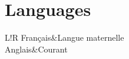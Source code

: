 \documentclass[6pt]{article}
\newcommand\VRule{\color{lightgray}\vrule width 0.5pt}
\begin{document}
\section*{Languages}
\begin{tabular}{L!{\VRule}R}
Fran\c{c}ais&Langue maternelle\\
Anglais&Courant\\
\end{tabular}
\end{document}
